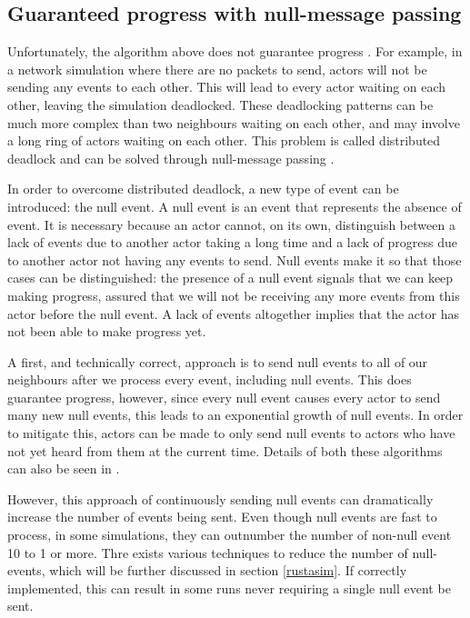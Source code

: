 \subsection{Guaranteed progress with null-message passing} \label{null-messages}

Unfortunately, the algorithm above does not guarantee progress \cite{misra_distributed_1986}.
For example, in a network simulation where there are no packets to send, actors will not be sending any events to each other.
This will lead to every actor waiting on each other, leaving the simulation deadlocked.
These deadlocking patterns can be much more complex than two neighbours waiting on each other, and may involve a long ring of actors waiting on each other.
This problem is called distributed deadlock and can be solved through null-message passing \cite{misra_distributed_1986}. %

In order to overcome distributed deadlock, a new type of event can be introduced: the null event. 
A null event is an event that represents the absence of event.
It is necessary because an actor cannot, on its own, distinguish between a lack of events due to another actor taking a long time and a lack of progress due to another actor not having any events to send.
Null events make it so that those cases can be distinguished: the presence of a null event signals that we can keep making progress, assured that we will not be receiving any more events from this actor before the null event.
A lack of events altogether implies that the actor has not been able to make progress yet.

A first, and technically correct, approach is to send null events to all of our neighbours after we process every event, including null events.
This does guarantee progress, however, since every null event causes every actor to send many new null events, this leads to an exponential growth of null events.
In order to mitigate this, actors can be made to only send null events to actors who have not yet heard from them at the current time.
Details of both these algorithms can also be seen in \cite{misra_distributed_1986}.

However, this approach of continuously sending null events can dramatically increase the number of events being sent.
Even though null events are fast to process, in some simulations, they can outnumber the number of non-null event 10 to 1 or more.
Thre exists various techniques to reduce the number of null-events, which will be further discussed in section \ref{rustasim}.
If correctly implemented, this can result in some runs never requiring a single null event be sent.

